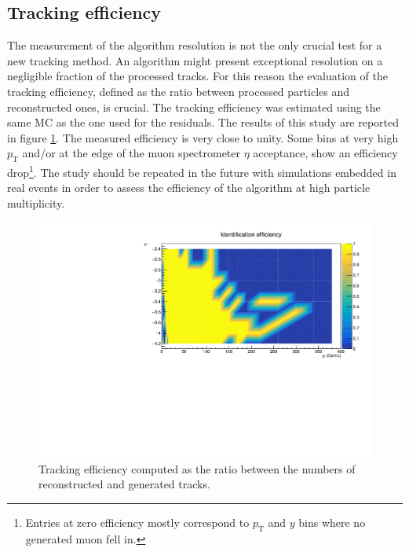 \subsection{Tracking efficiency}
The measurement of the algorithm resolution is not the only crucial test for a new tracking method.
An algorithm might present exceptional resolution on a negligible fraction of the processed tracks.
For this reason the evaluation of the tracking efficiency, defined as the ratio between processed particles and reconstructed ones, is crucial.
The tracking efficiency was estimated using the same MC as the one used for the residuals. 
The results of this study are reported in figure \ref{fig:ID_eff}.
The measured efficiency is very close to unity.
Some bins at very high $p_{\mathrm{T}}$ and/or at the edge of the muon spectrometer $\eta$ acceptance, show an efficiency drop\footnote{Entries at zero efficiency mostly correspond to $p_{\mathrm{T}}$ and $y$ bins where no generated muon fell in.}.
The study should be repeated in the future with simulations embedded in real events in order to assess the efficiency of the algorithm at high particle multiplicity.

\begin{figure}[!b]
\begin{center}
\includegraphics[width=0.9\linewidth]{Chapters/O2/Figs/ID_Eff.pdf}
\caption{Tracking efficiency computed as the ratio between the numbers of reconstructed and generated tracks.}
\label{fig:ID_eff}
\end{center}
\end{figure}

